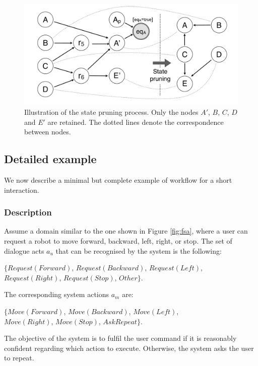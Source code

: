 \begin{figure}[h]
\centering
\includegraphics[scale=0.20]{imgs/pruning.pdf}
\caption{Illustration of the state pruning process. Only the nodes $A'$, $B$, $C$, $D$ and $E'$ are retained. The dotted lines denote the correspondence between nodes.}
\label{fig:pruning}
\end{figure}


\subsection{Detailed example}

We now describe a minimal but complete example of workflow for a short interaction. 

\subsubsection*{Description}

Assume a domain similar to the one shown in Figure \ref{fig:fsa}, where a user can request a robot to move forward, backward, left, right, or stop.  The set of dialogue acts $a_u$ that can be recognised by the system is the following: 
\begin{center}
$\{\mathit{Request(Forward)}$, $\mathit{Request(Backward)}$, $\mathit{Request(Left)}$, \\ $\mathit{Request(Right)}$, $\mathit{Request(Stop)}$, $\mathit{Other}\}$. \\
\end{center}
The corresponding system actions $a_m$ are: 
\begin{center}
$\{\mathit{Move(Forward)}$, $\mathit{Move(Backward)}$, $\mathit{Move(Left)}$, \\ $\mathit{Move(Right)}$, $\mathit{Move(Stop)}$, $\mathit{AskRepeat}\}$. 
\end{center}
The objective of the system is to fulfil the user command if it is reasonably confident regarding which action to execute.  Otherwise, the system asks the user to repeat. 

